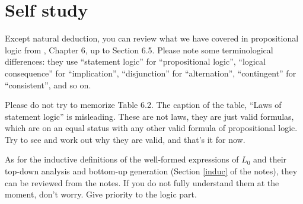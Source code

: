 \documentclass[11pt]{article}
\begin{document}
\section*{Self study} Except natural deduction, you can review what we have
covered in propositional logic from \cite{parteeetal90}, Chapter 6, up to
Section 6.5. Please note some terminological differences: they use ``statement
logic'' for ``propositional logic'', ``logical consequence'' for
``implication'', ``disjunction'' for ``alternation'', ``contingent'' for
``consistent'', and so on.

Please do not try to memorize Table 6.2. The caption of the table, ``Laws of
statement logic'' is misleading. These are not laws, they are just valid
formulas, which are on an equal status with any other valid formula of propositional
logic. Try to see and work out why they are valid, and that's it for now.

As for the inductive definitions of the well-formed expressions of $L_0$ and
their top-down analysis and bottom-up generation (Section \ref{induc} of the
notes), they can be reviewed from
the notes. If you do not fully understand them at the moment, don't worry. Give
priority to the logic part. 


\renewcommand{\bibsep}{0pt}
\renewcommand{\bibfont}{\small}


\end{document}
